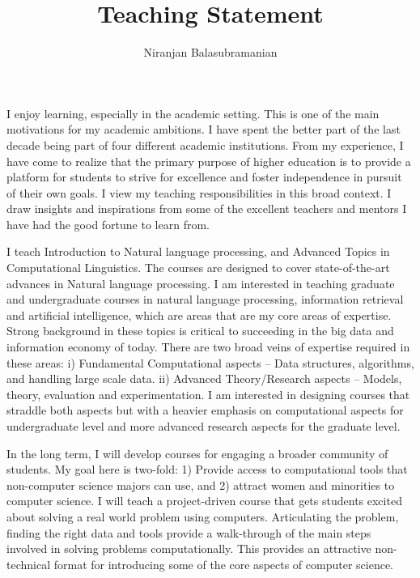 \documentclass[a4paper,11pt,onecolumn]{article}
\begin{document}

\title{Teaching Statement}
\author{Niranjan Balasubramanian}
\maketitle

I enjoy learning, especially in the academic setting. This is one of the main motivations for my academic ambitions. I have spent the better part of the last decade being part of four different academic institutions. From my experience, I have come to realize that the primary purpose of higher education is to provide a platform for students 
to strive for excellence and foster independence in pursuit of their own goals. I view my teaching responsibilities in this broad context. I draw insights and inspirations from some of the excellent teachers and mentors I have had the good fortune to learn from.

I teach Introduction to Natural language processing, and Advanced Topics in Computational Linguistics. The courses are designed to cover state-of-the-art advances in Natural language processing. 
I am interested in teaching graduate and undergraduate courses in natural language processing, information retrieval and artificial intelligence, which are areas that are my core areas of expertise. 
Strong background in these topics is critical to succeeding in the big data and information economy of today. There are two broad veins of expertise required in these areas: i) Fundamental Computational aspects -- Data structures, algorithms, and handling large scale data. ii) Advanced Theory/Research aspects -- Models, theory, evaluation and experimentation. I am interested in designing courses that straddle both aspects but with a heavier emphasis on computational aspects for undergraduate level and more advanced research aspects for the graduate level.

In the long term, I will develop courses for engaging a broader community of students. My goal here is two-fold: 1) Provide access to computational tools that non-computer science majors can use, and 2) attract women and minorities to computer science. I will teach a project-driven course that gets students excited about solving a real world problem using computers. Articulating the problem, finding the right data and tools provide a walk-through of the main steps involved in solving problems computationally. This provides an attractive non-technical format for introducing some of the core aspects of computer science. 
\end{document}
